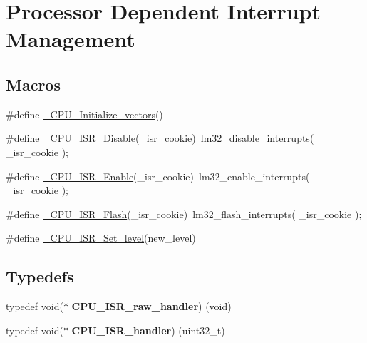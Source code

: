 \hypertarget{group__RTEMSScoreCPUlm32Interrupt}{}\section{Processor Dependent Interrupt Management}
\label{group__RTEMSScoreCPUlm32Interrupt}
\subsection*{Macros}
\begin{DoxyCompactItemize}
\item 
\#define \mbox{\hyperlink{group__RTEMSScoreCPUlm32Interrupt_gad1ef5062849284d81496e1e6d33fb7ff}{\+\_\+\+C\+P\+U\+\_\+\+Initialize\+\_\+vectors}}()
\item 
\#define \mbox{\hyperlink{group__RTEMSScoreCPUlm32Interrupt_gaca3fde6f372ee51fdd893c260e7d7146}{\+\_\+\+C\+P\+U\+\_\+\+I\+S\+R\+\_\+\+Disable}}(\+\_\+isr\+\_\+cookie)~lm32\+\_\+disable\+\_\+interrupts( \+\_\+isr\+\_\+cookie );
\item 
\#define \mbox{\hyperlink{group__RTEMSScoreCPUlm32Interrupt_gae3b1e2cd1ea4020d229e759569459664}{\+\_\+\+C\+P\+U\+\_\+\+I\+S\+R\+\_\+\+Enable}}(\+\_\+isr\+\_\+cookie)~lm32\+\_\+enable\+\_\+interrupts( \+\_\+isr\+\_\+cookie );
\item 
\#define \mbox{\hyperlink{group__RTEMSScoreCPUlm32Interrupt_gac7e58e16c6b558daf31fe8f9dbec5a69}{\+\_\+\+C\+P\+U\+\_\+\+I\+S\+R\+\_\+\+Flash}}(\+\_\+isr\+\_\+cookie)~lm32\+\_\+flash\+\_\+interrupts( \+\_\+isr\+\_\+cookie );
\item 
\#define \mbox{\hyperlink{group__RTEMSScoreCPUlm32Interrupt_gaed8717a2f15938d954c7124cd11e899f}{\+\_\+\+C\+P\+U\+\_\+\+I\+S\+R\+\_\+\+Set\+\_\+level}}(new\+\_\+level)
\end{DoxyCompactItemize}
\subsection*{Typedefs}
\begin{DoxyCompactItemize}
\item 
\mbox{\label{group__RTEMSScoreCPUlm32Interrupt_gaddfaa82155a005077bfd1d41dc6e8cf5}} 
typedef void($\ast$ {\bfseries C\+P\+U\+\_\+\+I\+S\+R\+\_\+raw\+\_\+handler}) (void)
\item 
\mbox{\label{group__RTEMSScoreCPUlm32Interrupt_ga6d0204fc99c704f9f7c1e7b4e8b3657a}} 
typedef void($\ast$ {\bfseries C\+P\+U\+\_\+\+I\+S\+R\+\_\+handler}) (uint32\+\_\+t)
\end{DoxyCompactItemize}
